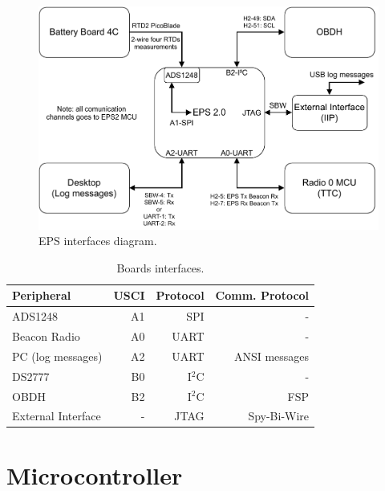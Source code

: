 \begin{figure}[!ht]
    \begin{center}
        \includegraphics[width=\textwidth]{figures/eps-interfaces-diagram.pdf}
        \caption{EPS interfaces diagram.}
        \label{fig:diagram-interfaces}
    \end{center}
\end{figure}

\begin{table}[!h]
    \centering
    \begin{tabular}{lrrr}
        \toprule[1.5pt]
        \textbf{Peripheral}     & \textbf{USCI} & \textbf{Protocol} & \textbf{Comm. Protocol} \\
        \midrule
        ADS1248                 & A1            & SPI               & - \\
        Beacon Radio            & A0            & UART              & - \\
        PC (log messages)       & A2            & UART              & ANSI messages \\
        DS2777                  & B0            & I$^{2}$C          & - \\
        OBDH                    & B2            & I$^{2}$C          & FSP \\
        External Interface      & -             & JTAG              & Spy-Bi-Wire \\
        \bottomrule[1.5pt]
    \end{tabular}
    \caption{Boards interfaces.}
    \label{tab:interfaces}
\end{table}

\section{Microcontroller}

